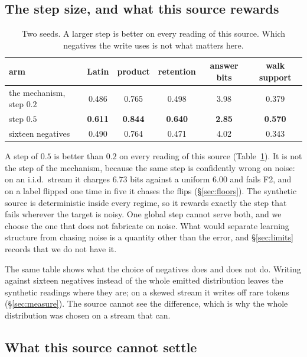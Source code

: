\documentclass[11pt,a4paper]{article}
\theoremstyle{plain}
\theoremstyle{definition}
\theoremstyle{remark}
\begin{document}
\subsection{The step size, and what this source rewards}
\label{sec:step}

\begin{table}[h]
\centering
\small
\begin{tabular}{lccccc}
\toprule
arm & Latin & product & retention & answer bits & walk support\\
\midrule
the mechanism, step $0.2$ & 0.486 & 0.765 & 0.498 & 3.98 & 0.379\\
step $0.5$ & \textbf{0.611} & \textbf{0.844} & \textbf{0.640} & \textbf{2.85} & \textbf{0.570}\\
sixteen negatives & 0.490 & 0.764 & 0.471 & 4.02 & 0.343\\
\bottomrule
\end{tabular}
\caption{Two seeds. A larger step is better on every reading of this source.
Which negatives the write uses is not what matters here.}
\label{tab:step}
\end{table}

A step of $0.5$ is better than $0.2$ on every reading of this source
(Table~\ref{tab:step}). It is not the step of the mechanism, because the same
step is confidently wrong on noise: on an i.i.d.\ stream it charges $6.73$ bits
against a uniform $6.00$ and fails F2, and on a label flipped one time in five it
chases the flips (\S\ref{sec:floors}). The synthetic source is deterministic
inside every regime, so it rewards exactly the step that fails wherever the
target is noisy. One global step cannot serve both, and we choose the one that
does not fabricate on noise. What would separate learning structure from chasing
noise is a quantity other than the error, and \S\ref{sec:limits} records that
we do not have it.

The same table shows what the choice of negatives does and does not do. Writing
against sixteen negatives instead of the whole emitted distribution leaves the
synthetic readings where they are; on a skewed stream it writes off rare tokens
(\S\ref{sec:measure}). The source cannot see the difference, which is why the
whole distribution was chosen on a stream that can.

\subsection{What this source cannot settle}
\label{sec:cannot}
\end{document}
